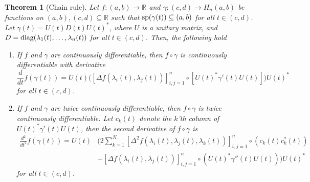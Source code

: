 \documentclass[12pt,a4paper]{amsart}
\newtheorem{theorem}{Theorem}
\theoremstyle{definition}
\begin{document}
	\begin{theorem}[Chain rule]\label{chain-rule-for-matrices}
		Let $f :(a, b) \rightarrow \mathbb{R}$ and $\gamma: (c,d) \rightarrow H_n(a, b)$ be functions on $(a, b), (c,d) \subseteq \mathbb{R}$ such that $\textnormal{sp}(\gamma(t)) \subseteq (a,b)$ for all $t \in (c, d)$. Let $\gamma(t) = U(t) D(t) U(t)^{*}$, where $U$ is a unitary matrix, and $D=\textnormal{diag}(\lambda_1(t),  \ldots, \lambda_n(t))$ for all $t \in (c,d)$. Then, the following hold
		\begin{enumerate}[label=\textnormal{(\Roman*)}]
			\item If $f$ and $\gamma$ are continuously differentiable, then $f \circ \gamma$ is continuously differentiable with derivative 
			\[ \frac{d}{dt} f(\gamma(t)) = U(t) \bigg( [\Delta f(\lambda_i(t), \lambda_j(t))]_{i, j = 1}^{n} \circ [U(t)^{*} \gamma'(t)U(t)] \bigg) U(t)^{*}  \]
			for all $t \in (c, d)$.
			\item  If $f$ and $\gamma$ are twice continuously differentiable, then $f \circ \gamma$ is twice continuously differentiable. Let $c_k(t)$ denote the $k$'th column of $U(t)^{*}\gamma'(t)U(t)$, then the second derivative of $f \circ \gamma$ is
			\begin{equation*}
				\begin{split}
					\frac{d^{2}}{dt^{2}} f(\gamma(t)) = U(t) &\bigg( 2 \sum_{k=1}^{N} [\Delta^{2}f(\lambda_i(t), \lambda_j(t), \lambda_k(t))]^{n}_{i,j=1} \circ (c_k(t) c_k^{*}(t))   \\
					&+[\Delta f(\lambda_i(t), \lambda_j(t))]_{i, j = 1}^{n} \circ (U(t)^{*} \gamma''(t) U(t)) \bigg)U(t)^{*}
				\end{split}
			\end{equation*}
			for all $t \in (c, d)$.
		\end{enumerate}
	\end{theorem}
	
\end{document}
